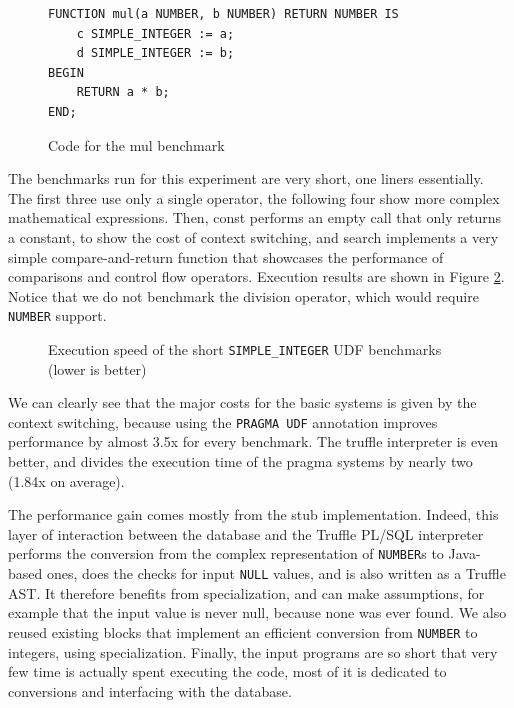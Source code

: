 \documentclass[twoside,11pt,a4paper]{article}
\newcommand{\pls}[1]{\small\texttt{#1}\normalsize}
\newcommand{\plstype}[1]{\pls{#1}}
\newcommand{\oranum}{\plstype{NUMBER}}
\newcommand{\simpleint}{\plstype{SIMPLE\_INTEGER}}
\newcommand{\plsnull}{\pls{NULL}}
\newcommand{\benchsystem}[1]{\textsf{#1}}
\newcommand{\truffle}{\benchsystem{truffle}}
\newcommand{\bench}[1]{\textsf{#1}}
\begin{document}
\begin{figure}[hbt]
	\begin{lstlisting}[style=PLSQL, frame=L]
FUNCTION mul(a NUMBER, b NUMBER) RETURN NUMBER IS
	c SIMPLE_INTEGER := a;
	d SIMPLE_INTEGER := b;
BEGIN
	RETURN a * b;
END;
	\end{lstlisting}
	\caption{Code for the \bench{mul} benchmark}
	\label{fig:mulbench}
\end{figure}

The benchmarks run for this experiment are very short, one liners essentially. The first three use only a single operator, the following four show more complex mathematical expressions. Then, \bench{const} performs an empty call that only returns a constant, to show the cost of context switching, and \bench{search} implements a very simple compare-and-return function that showcases the performance of comparisons and control flow operators. Execution results are shown in Figure \ref{fig:exp1a}. Notice that we do not benchmark the division operator, which would require \oranum{} support.

\begin{figure}[tp]
	\centering
	\caption[Execution speed of the short \simpleint{} UDF benchmarks]{Execution speed of the short \simpleint{} UDF benchmarks (lower is better)}
	\label{fig:exp1a}
\end{figure}

We can clearly see that the major costs for the basic systems is given by the context switching, because using the \pls{PRAGMA UDF} annotation improves performance by almost 3.5x for every benchmark. The \truffle{} interpreter is even better, and divides the execution time of the \benchsystem{pragma} systems by nearly two (1.84x on average).

The performance gain comes mostly from the stub implementation. Indeed, this layer of interaction between the database and the Truffle PL/SQL interpreter performs the conversion from the complex representation of \oranum{}s to Java-based ones, does the checks for input \plsnull{} values, and is also written as a Truffle AST. It therefore benefits from specialization, and can make assumptions, for example that the input value is never null, because none was ever found. We also reused existing blocks that implement an efficient conversion from \oranum{} to integers, using specialization. Finally, the input programs are so short that very few time is actually spent executing the code, most of it is dedicated to conversions and interfacing with the database.
\end{document}
